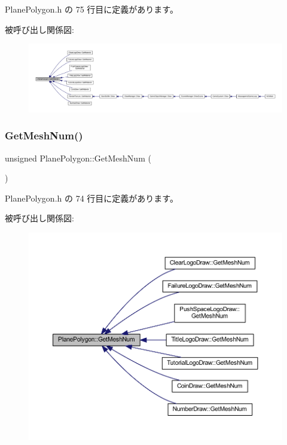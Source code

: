  Plane\+Polygon.\+h の 75 行目に定義があります。

被呼び出し関係図\+:
\nopagebreak
\begin{figure}[H]
\begin{center}
\leavevmode
\includegraphics[width=350pt]{class_plane_polygon_a808087c9d82c0eb7cfb0709c9906e833_icgraph}
\end{center}
\end{figure}
\mbox{\label{class_plane_polygon_a05f4f63c2d04d30f7b9808c009101403}} 
\subsubsection{\texorpdfstring{Get\+Mesh\+Num()}{GetMeshNum()}}
{\footnotesize\ttfamily unsigned Plane\+Polygon\+::\+Get\+Mesh\+Num (\begin{DoxyParamCaption}{ }\end{DoxyParamCaption})\hspace{0.3cm}{\ttfamily [inline]}}



 Plane\+Polygon.\+h の 74 行目に定義があります。

被呼び出し関係図\+:\nopagebreak
\begin{figure}[H]
\begin{center}
\leavevmode
\includegraphics[width=350pt]{class_plane_polygon_a05f4f63c2d04d30f7b9808c009101403_icgraph}
\end{center}
\end{figure}
\mbox{\label{class_plane_polygon_a535d0222908f4a4a030d8b525b225554}} 
